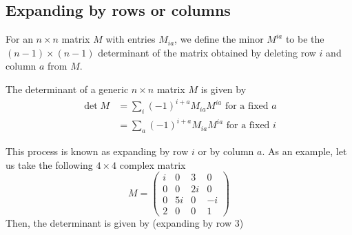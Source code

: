 \subsection{Expanding by rows or columns}
For an \(n \times n\) matrix \(M\) with entries \(M_{ia}\), we define the minor \(M^{ia}\) to be the \((n-1)\times(n-1)\) determinant of the matrix obtained by deleting row \(i\) and column \(a\) from \(M\).
\begin{proposition}
	The determinant of a generic \(n \times n\) matrix \(M\) is given by
	\begin{align*}
		\det M
		 & = \sum_i (-1)^{i+a} M_{ia} M^{ia} \text{ for a fixed \(a\)} \\
		 & = \sum_a (-1)^{i+a} M_{ia} M^{ia} \text{ for a fixed \(i\)}
	\end{align*}
\end{proposition}
This process is known as expanding by row \(i\) or by column \(a\).
As an example, let us take the following \(4 \times 4\) complex matrix
\[
	M = \begin{pmatrix}
		i & 0  & 3  & 0  \\
		0 & 0  & 2i & 0  \\
		0 & 5i & 0  & -i \\
		2 & 0  & 0  & 1
	\end{pmatrix}
\]
Then, the determinant is given by (expanding by row 3)
